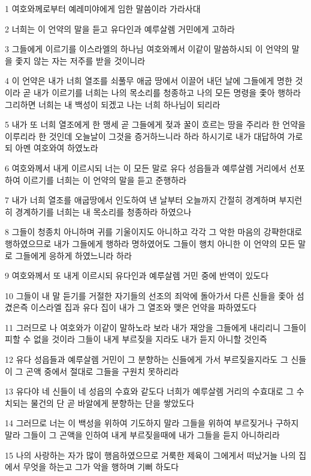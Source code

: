\par 1 여호와께로부터 예레미야에게 임한 말씀이라 가라사대
\par 2 너희는 이 언약의 말을 듣고 유다인과 예루살렘 거민에게 고하라
\par 3 그들에게 이르기를 이스라엘의 하나님 여호와께서 이같이 말씀하시되 이 언약의 말을 좇지 않는 자는 저주를 받을 것이니라
\par 4 이 언약은 내가 너희 열조를 쇠풀무 애굽 땅에서 이끌어 내던 날에 그들에게 명한 것이라 곧 내가 이르기를 너희는 나의 목소리를 청종하고 나의 모든 명령을 좇아 행하라 그리하면 너희는 내 백성이 되겠고 나는 너희 하나님이 되리라
\par 5 내가 또 너희 열조에게 한 맹세 곧 그들에게 젖과 꿀이 흐르는 땅을 주리라 한 언약을 이루리라 한 것인데 오늘날이 그것을 증거하느니라 하라 하시기로 내가 대답하여 가로되 아멘 여호와여 하였노라
\par 6 여호와께서 내게 이르시되 너는 이 모든 말로 유다 성읍들과 예루살렘 거리에서 선포하여 이르기를 너희는 이 언약의 말을 듣고 준행하라
\par 7 내가 너희 열조를 애굽땅에서 인도하여 낸 날부터 오늘까지 간절히 경계하며 부지런히 경계하기를 너희는 내 목소리를 청종하라 하였으나
\par 8 그들이 청종치 아니하며 귀를 기울이지도 아니하고 각각 그 악한 마음의 강퍅한대로 행하였으므로 내가 그들에게 행하라 명하였어도 그들이 행치 아니한 이 언약의 모든 말로 그들에게 응하게 하였느니라 하라
\par 9 여호와께서 또 내게 이르시되 유다인과 예루살렘 거민 중에 반역이 있도다
\par 10 그들이 내 말 듣기를 거절한 자기들의 선조의 죄악에 돌아가서 다른 신들을 좇아 섬겼은즉 이스라엘 집과 유다 집이 내가 그 열조와 맺은 언약을 파하였도다
\par 11 그러므로 나 여호와가 이같이 말하노라 보라 내가 재앙을 그들에게 내리리니 그들이 피할 수 없을 것이라 그들이 내게 부르짖을 지라도 내가 듣지 아니할 것인즉
\par 12 유다 성읍들과 예루살렘 거민이 그 분향하는 신들에게 가서 부르짖을지라도 그 신들이 그 곤액 중에서 절대로 그들을 구원치 못하리라
\par 13 유다야 네 신들이 네 성읍의 수효와 같도다 너희가 예루살렘 거리의 수효대로 그 수치되는 물건의 단 곧 바알에게 분향하는 단을 쌓았도다
\par 14 그러므로 너는 이 백성을 위하여 기도하지 말라 그들을 위하여 부르짖거나 구하지 말라 그들이 그 곤액을 인하여 내게 부르짖을때에 내가 그들을 듣지 아니하리라
\par 15 나의 사랑하는 자가 많이 행음하였으므로 거룩한 제육이 그에게서 떠났거늘 나의 집에서 무엇을 하는고 그가 악을 행하며 기뻐 하도다

